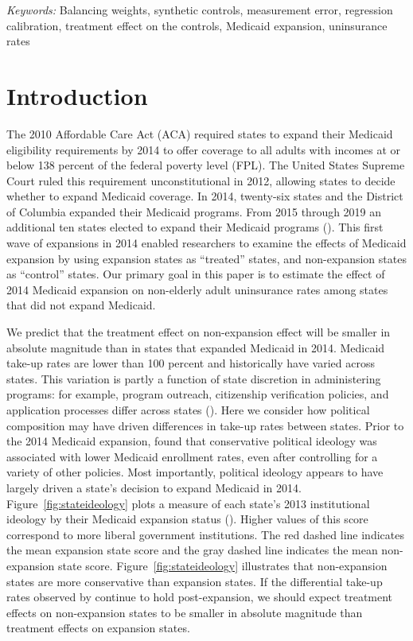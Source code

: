 \documentclass[12pt]{article}
\def\spacingset#1{\renewcommand{\baselinestretch}%
{#1}\small\normalsize} \spacingset{1}
\begin{document}
\noindent%
{\it Keywords:} Balancing weights, synthetic controls, measurement error, regression calibration, treatment effect on the controls, Medicaid expansion, uninsurance rates
\vfill

\newpage
\spacingset{1.45} %

\maketitle

\section{Introduction}

The 2010 Affordable Care Act (ACA) required states to expand their Medicaid eligibility requirements by 2014 to offer coverage to all adults with incomes at or below 138 percent of the federal poverty level (FPL). The United States Supreme Court ruled this requirement unconstitutional in 2012, allowing states to decide whether to expand Medicaid coverage. In 2014, twenty-six states and the District of Columbia expanded their Medicaid programs. From 2015 through 2019 an additional ten states elected to expand their Medicaid programs (\cite{KFF}). This first wave of expansions in 2014 enabled researchers to examine the effects of Medicaid expansion by using expansion states as ``treated'' states, and non-expansion states as ``control'' states. Our primary goal in this paper is to estimate the effect of 2014 Medicaid expansion on non-elderly adult uninsurance rates among states that did not expand Medicaid.

We predict that the treatment effect on non-expansion effect will be smaller in absolute magnitude than in states that expanded Medicaid in 2014. Medicaid take-up rates are lower than 100 percent and historically have varied across states. This variation is partly a function of state discretion in administering programs: for example, program outreach, citizenship verification policies, and application processes differ across states (\cite{courtemanche2017early}). Here we consider how political composition may have driven differences in take-up rates between states. Prior to the 2014 Medicaid expansion, \cite{sommers2012understanding} found that conservative political ideology was associated with lower Medicaid enrollment rates, even after controlling for a variety of other policies. Most importantly, political ideology appears to have largely driven a state's decision to expand Medicaid in 2014. Figure~\ref{fig:stateideology} plots a measure of each state's 2013 institutional ideology by their Medicaid expansion status (\cite{fording}). Higher values of this score correspond to more liberal government institutions. The red dashed line indicates the mean expansion state score and the gray dashed line indicates the mean non-expansion state score. Figure~\ref{fig:stateideology} illustrates that non-expansion states are more conservative than expansion states. If the differential take-up rates observed by \cite{sommers2012understanding} continue to hold post-expansion, we should expect treatment effects on non-expansion states to be smaller in absolute magnitude than treatment effects on expansion states. 
\end{document}
